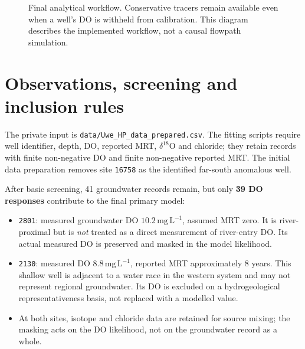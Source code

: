 \documentclass[11pt,a4paper]{article}
\newcommand{\site}[1]{\texttt{#1}}
\newcommand{\mgL}{\mathrm{mg\,L^{-1}}}
\begin{document}
\begin{figure}[htbp]
\centering
{}
\caption{Final analytical workflow. Conservative tracers remain available even when a well's DO is withheld from calibration. This diagram describes the implemented workflow, not a causal flowpath simulation.}
\label{fig:workflow}
\end{figure}

\section{Observations, screening and inclusion rules}
The private input is \texttt{data/Uwe\_HP\_data\_prepared.csv}. The fitting scripts require well identifier, depth, DO, reported MRT, \(\delta^{18}\mathrm{O}\) and chloride; they retain records with finite non-negative DO and finite non-negative reported MRT. The initial data preparation removes site \site{16758} as the identified far-south anomalous well.

After basic screening, 41 groundwater records remain, but only \textbf{39 DO responses} contribute to the final primary model:
\begin{itemize}
\item \site{2801}: measured groundwater DO \(10.2\,\mgL\), assumed MRT zero. It is river-proximal but is \emph{not} treated as a direct measurement of river-entry DO. Its actual measured DO is preserved and masked in the model likelihood.
\item \site{2130}: measured DO \(8.8\,\mgL\), reported MRT approximately 8 years. This shallow well is adjacent to a water race in the western system and may not represent regional groundwater. Its DO is excluded on a hydrogeological representativeness basis, not replaced with a modelled value.
\item At both sites, isotope and chloride data are retained for source mixing; the masking acts on the DO likelihood, not on the groundwater record as a whole.
\end{itemize}
\end{document}
